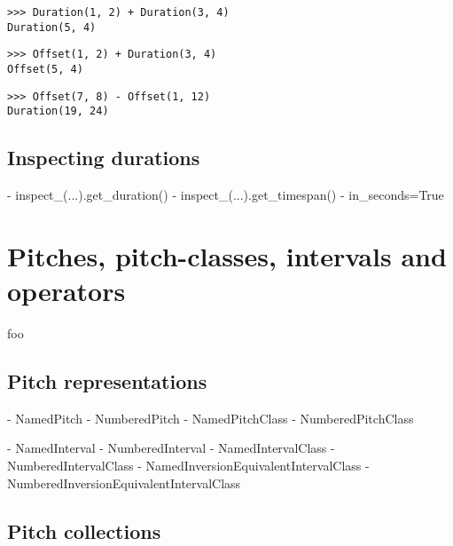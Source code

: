 \begin{abjadbookoutput}
\begin{singlespacing}
\vspace{-0.5\baselineskip}
\begin{lstlisting}
>>> Duration(1, 2) + Duration(3, 4)
Duration(5, 4)
\end{lstlisting}
\begin{lstlisting}
>>> Offset(1, 2) + Duration(3, 4)
Offset(5, 4)
\end{lstlisting}
\begin{lstlisting}
>>> Offset(7, 8) - Offset(1, 12)
Duration(19, 24)
\end{lstlisting}
\end{singlespacing}
\end{abjadbookoutput}

\subsection{Inspecting durations}

\begin{markdown}
-   inspect_(...).get_duration()
-   inspect_(...).get_timespan()
-   in_seconds=True
\end{markdown}

\section{Pitches, pitch-classes, intervals and operators}

foo

\subsection{Pitch representations}

\begin{markdown}
- NamedPitch
- NumberedPitch
- NamedPitchClass
- NumberedPitchClass
\end{markdown}

\begin{markdown}
- NamedInterval
- NumberedInterval
- NamedIntervalClass
- NumberedIntervalClass
- NamedInversionEquivalentIntervalClass
- NumberedInversionEquivalentIntervalClass
\end{markdown}

\subsection{Pitch collections}

